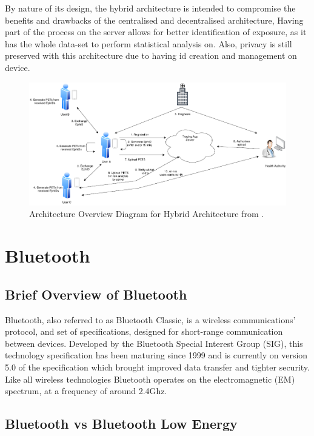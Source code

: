 \documentclass{l4proj}
\begin{document}
By nature of its design, the hybrid architecture is intended to compromise the benefits and drawbacks of the centralised and decentralised architecture, Having part of the process on the server allows for better identification of exposure, as it has the whole data-set to perform statistical analysis on. Also, privacy is still preserved with this architecture due to having id creation and management on device.

\begin{figure}[!htb]
    \centering
    \includegraphics[width=0.8\linewidth]{images/ahmed_hybrid.png}

    \caption{ Architecture Overview Diagram for Hybrid Architecture from \citet{ahmed_survey_2020}.
    }

    \label{fig:hybrid_arch}
\end{figure}

\section{Bluetooth}

\subsection{Brief Overview of Bluetooth}

Bluetooth, also referred to as Bluetooth Classic, is a wireless communications' protocol, and set of specifications, designed for short-range communication between devices. Developed by the Bluetooth Special Interest Group (SIG), this technology specification has been maturing since 1999 and is currently on version 5.0 of the specification which brought improved data transfer and tighter security. Like all wireless technologies Bluetooth operates on the electromagnetic (EM) spectrum, at a frequency of around 2.4Ghz.

\subsection{Bluetooth vs Bluetooth Low Energy}
\end{document}
